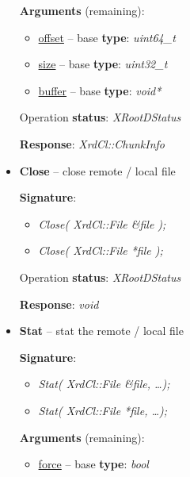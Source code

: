 \documentclass{article}
\begin{document}
\begin{itemize}
\begin{samepage}
                    \textbf{Arguments} (remaining):
                    \begin{itemize}
                        \item \underline{offset} -- base \textbf{type}: \textit{uint64_t}
                        \item \underline{size} -- base \textbf{type}: \textit{uint32_t}
                        \item \underline{buffer} -- base \textbf{type}: \textit{void*}
                    \end{itemize}

                    Operation \textbf{status}: \textit{XRootDStatus}

                    \textbf{Response}: \textit{XrdCl::ChunkInfo}

                \end{samepage}

                \item \begin{samepage} \textbf{Close} -- close remote / local file

                    \textbf{Signature}:
                    \begin{itemize} 
                        \item \textit{Close( XrdCl::File \&file );}
                        \item \textit{Close( XrdCl::File *file );}
                    \end{itemize}

                    Operation \textbf{status}: \textit{XRootDStatus}

                    \textbf{Response}: \textit{void}

                \end{samepage}

                \item \begin{samepage} \textbf{Stat} -- stat the remote / local file

                    \textbf{Signature}:
                    \begin{itemize} 
                        \item \textit{Stat( XrdCl::File \&file, \ldots);}
                        \item \textit{Stat( XrdCl::File *file, \ldots );}
                    \end{itemize}

                    \textbf{Arguments} (remaining):
                    \begin{itemize}
                        \item \underline{force} -- base \textbf{type}: \textit{bool}
                    \end{itemize}


\end{samepage}
\end{itemize}
\end{document}
